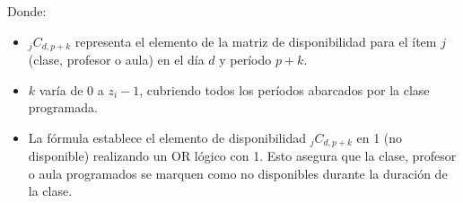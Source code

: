 Donde:
\begin{itemize}
    \item \( _jC_{d, p+k} \) representa el elemento de la matriz de disponibilidad para el ítem \( j \) (clase, profesor o aula) en el día \( d \) y período \( p+k \).
    \item \( k \) varía de 0 a \( z_i - 1 \), cubriendo todos los períodos abarcados por la clase programada.
    \item La fórmula establece el elemento de disponibilidad \( _jC_{d, p+k} \) en 1 (no disponible) realizando un OR lógico con 1.
    Esto asegura que la clase, profesor o aula programados se marquen como no disponibles durante la duración de la clase.
\end{itemize}

